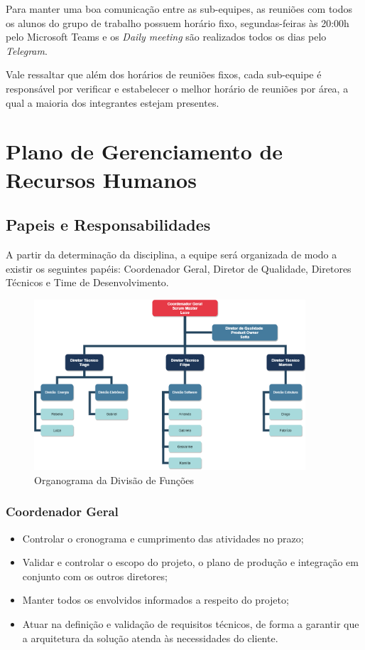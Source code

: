 \begin{apendicesenv}
Para manter uma boa comunicação entre as sub-equipes, as reuniões com todos os alunos do grupo de trabalho possuem horário fixo, segundas-feiras às 20:00h pelo {Microsoft Teams} e os \textit{Daily meeting} são realizados todos os dias pelo \textit{Telegram}.

Vale ressaltar que além dos horários de reuniões fixos, cada sub-equipe é responsável por verificar e estabelecer o melhor horário de reuniões por área, a qual a maioria dos integrantes estejam presentes.

\chapter{Plano de Gerenciamento de Recursos Humanos}
\label{RH_app}

\section{Papeis e Responsabilidades}
A partir da determinação da disciplina, a equipe será organizada de modo a existir os seguintes papéis: Coordenador Geral, Diretor de Qualidade, Diretores Técnicos e Time de Desenvolvimento.

\begin{figure}[H]
    \centering
    \includegraphics[width=0.9\textwidth]{figuras/div_papeis.png}
    \caption{Organograma da Divisão de Funções}
    \label{fig:papeis}
\end{figure}

\subsection{Coordenador Geral}
\begin{itemize}
    \item Controlar o cronograma e cumprimento das atividades no prazo;
    \item Validar e controlar o escopo do projeto, o plano de produção e integração em conjunto com os outros diretores;
    \item Manter todos os envolvidos informados a respeito do projeto;
    \item Atuar na definição e validação de requisitos técnicos, de forma a garantir que a arquitetura da solução atenda às necessidades do cliente.
\end{itemize}


\end{apendicesenv}

